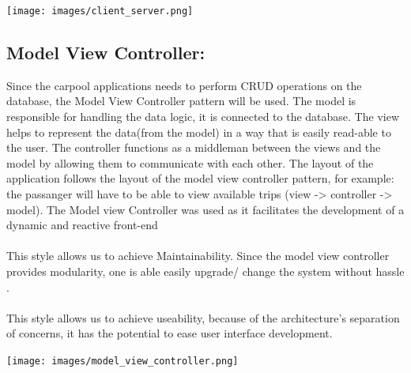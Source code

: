 \documentclass[hidelinks, 12pt, a4paper]{article}
\begin{document}
\begin{center}
    \noindent
    \texttt{[image: images/client\_server.png]}
    \vspace{0.5cm}
\end{center}
\subsection{\textbf{Model View Controller:}}
\newline
Since the carpool applications needs to perform CRUD operations on  the database, the Model View Controller pattern will be used. The model is responsible for handling the data logic, it is connected to the database. The view helps to represent the data(from the model) in a way that is easily read-able to the user. The controller functions as a middleman between the views and the model by allowing them to communicate with each other.
The layout of the application follows the layout of the model view controller pattern, for example: the passanger will have to be able to view available trips (view -> controller -> model).
The Model view Controller was used as it facilitates the development of a dynamic and reactive front-end  \\ \\
This style allows us to achieve Maintainability. Since the model view controller provides modularity, one is able easily upgrade/ change the system without hassle  .\\ \\
This style allows us to achieve useability, because of the architecture's separation of concerns, it has the potential to ease user interface development.
 \vspace{0.2cm}
\begin{center}
    \noindent
    \texttt{[image: images/model\_view\_controller.png]}
    \vspace{0.5cm}
\end{center}
\end{document}
